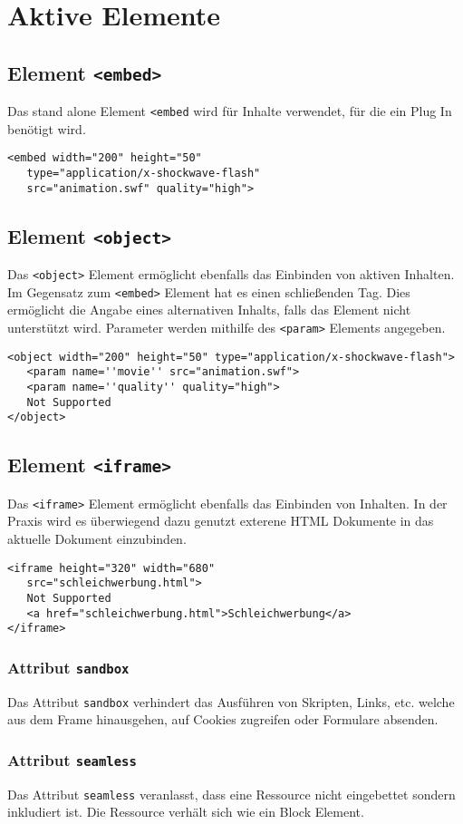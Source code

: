 \chapter{Aktive Elemente} 
\section{Element \texttt{<embed>}}
Das stand alone Element \texttt{<embed} wird für Inhalte verwendet, für die ein Plug In benötigt wird.
\begin{lstlisting}[caption=''Beispiel embed'']
<embed width="200" height="50" 
   type="application/x-shockwave-flash"
   src="animation.swf" quality="high">
\end{lstlisting}
\section{Element \texttt{<object>}}
Das \texttt{<object>} Element ermöglicht ebenfalls das Einbinden von aktiven Inhalten. Im Gegensatz zum \texttt{<embed>} Element hat es einen schließenden Tag. Dies ermöglicht die Angabe eines alternativen Inhalts, falls das Element nicht unterstützt wird. Parameter werden mithilfe des \texttt{<param>} Elements angegeben.
\begin{lstlisting}[caption=''Beispiel object'']
<object width="200" height="50" type="application/x-shockwave-flash">
   <param name=''movie'' src="animation.swf">
   <param name=''quality'' quality="high">
   Not Supported
</object>
\end{lstlisting}
\section{Element \texttt{<iframe>}}
Das \texttt{<iframe>} Element ermöglicht ebenfalls das Einbinden von Inhalten. In der Praxis wird es überwiegend dazu genutzt exterene HTML Dokumente in das aktuelle Dokument einzubinden.
\begin{lstlisting}[caption=''Beispiel iframe'']
<iframe height="320" width="680"
   src="schleichwerbung.html">
   Not Supported
   <a href="schleichwerbung.html">Schleichwerbung</a>
</iframe>
\end{lstlisting}
\subsection{Attribut \texttt{sandbox}}
Das Attribut \texttt{sandbox} verhindert das Ausführen von Skripten, Links, etc. welche aus dem Frame hinausgehen, auf Cookies zugreifen oder Formulare absenden.
\subsection{Attribut \texttt{seamless}}
Das Attribut \texttt{seamless} veranlasst, dass eine Ressource nicht eingebettet sondern inkludiert ist. Die Ressource verhält sich wie ein Block Element.